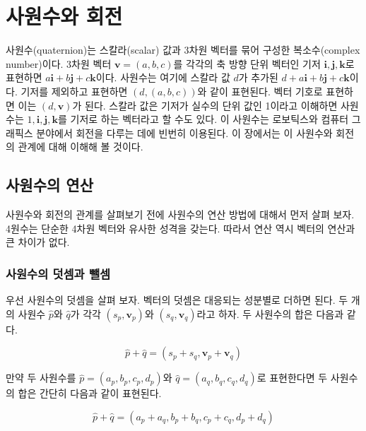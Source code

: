 \renewcommand\chapterillustration{Math_quaternion/chapterImage}



\chapter{사원수와 회전}

사원수(quaternion)는 스칼라(scalar) 값과 3차원 벡터를 묶어 구성한 복소수(complex number)이다.
3차원 벡터 $\mathbf v = (a, b, c)$를 각각의 축 방향 단위 벡터인 기저 $\mathbf i, \mathbf  j, \mathbf k$로 표현하면 $a{\mathbf i} + b {\mathbf j} + c {\mathbf k}$이다.
사원수는 여기에 스칼라 값 $d$가 추가된 $d + a{\mathbf i} + b {\mathbf j} + c {\mathbf k}$이다.
기저를 제외하고 표현하면 $(d, (a, b, c))$와 같이 표현된다. 벡터 기호로 표현하면 이는 $(d, \mathbf v)$가 된다.
스칼라 값은 기저가 실수의 단위 값인 1이라고 이해하면 사원수는 $1, \mathbf i, \mathbf  j, \mathbf k$를 기저로 하는 벡터라고 할 수도 있다.
이 사원수는 로보틱스와 컴퓨터 그래픽스 분야에서 회전을 다루는 데에 빈번히 이용된다. 이 장에서는 이 사원수와 회전의 관계에 대해 이해해 볼 것이다.

\section{사원수의 연산}

사원수와 회전의 관계를 살펴보기 전에 사원수의 연산 방법에 대해서 먼저 살펴 보자.
4원수는 단순한 4차원 벡터와 유사한 성격을 갖는다.
따라서 연산 역시 벡터의 연산과 큰 차이가 없다.

\subsection{사원수의 덧셈과 뺄셈}
우선 사원수의 덧셈을 살펴 보자. 벡터의 덧셈은 대응되는 성분별로 더하면 된다.
두 개의 사원수 $\hat{p}$와 $\hat{q}$가 각각 $(s_p, \mathbf v_p)$와 $(s_q, \mathbf v_q)$라고 하자.
두 사원수의 합은 다음과 같다.

$$\hat{p} + \hat{q} = (s_p + s_q , \mathbf v_p + \mathbf v_q )$$

만약 두 사원수를 $\hat{p} = (a_p, b_p, c_p, d_p)$와 $\hat{q} = (a_q, b_q, c_q, d_q)$로 표현한다면 두 사원수의 합은 
간단히 다음과 같이 표현된다.

$$\hat{p} + \hat{q} = (a_p + a_q, b_p + b_q , c_p + c_q , d_p + d_q)$$

